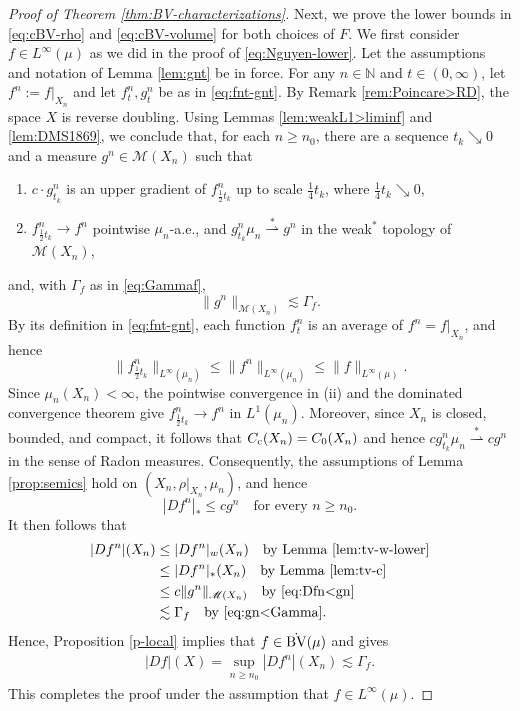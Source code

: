 \documentclass[11pt]{amsart}
\theoremstyle{definition}
\theoremstyle{remark}
\numberwithin{equation}{section}
\newcommand{\Norm}[2]{\|#1\|_{#2}}
\begin{document}
\begin{proof}[Proof of Theorem \ref{thm:BV-characterizations}]
Next, we prove the lower bounds in \eqref{eq:cBV-rho} and
\eqref{eq:cBV-volume} for both choices of $F$.
We first consider $f\in L^\infty(\mu)$ as we did in the proof of \eqref{eq:Nguyen-lower}.
Let the assumptions and notation of Lemma \ref{lem:gnt} be in force.
For any $n\in\mathbb{N}$ and $t\in(0,\infty)$, let $f^n:=f|_{X_n}$ and let $f^n_t,
g^n_t$ be as in \eqref{eq:fnt-gnt}.
By Remark \ref{rem:Poincare>RD}, the space $X$ is reverse doubling. Using Lemmas
\ref{lem:weakL1>liminf} and \ref{lem:DMS1869}, we conclude that,
for each $n\geq n_0$, there are a sequence $t_k\searrow 0$ and a
measure $g^n\in\mathscr M (X_n)$ such that
\begin{enumerate}[\rm(i)]
  \item $c\cdot g_{t_k}^n$ is an upper gradient of $f^n_{\frac12 t_k}$ up to scale $\frac14
  t_k$, where $\frac14 t_k\searrow 0$,
  \item $f^n_{\frac12 t_k}\to f^n$ pointwise $\mu_n$-a.e., and
  $g^n_{t_k}\mu_n\overset{*}{\rightharpoonup} g^n$ in the weak$^*$ topology of
  $\mathscr{M}(X_n)$,
\end{enumerate}
and, with $\Gamma_f$ as in \eqref{eq:Gammaf},
\begin{equation}\label{eq:gn<Gamma}
    \Norm{g^n}{\mathscr M(X_n)}
    \lesssim\Gamma_f.
\end{equation}
By its definition in \eqref{eq:fnt-gnt}, each function $f^n_t$ is an average of
$f^n=f|_{X_n}$,
and hence
$$
\Norm{f^n_{\frac12t_k}}{L^\infty(\mu_n)}\leq  \|f^n\|_{L^\infty(\mu_n)}\leq
\|f\|_{L^\infty(\mu)}.
$$
Since $\mu_n(X_n)<\infty$, the pointwise convergence in (ii) and the dominated convergence
theorem
give
$f^n_{\frac12t_k}\longrightarrow f^n$
in $L^1(\mu_n).$
Moreover, since $X_n$ is closed, bounded, and compact, it follows that
$C_{\rm c}(X_n) = C_0(X_n)$ and hence
$c g^n_{t_k}\mu_n\overset{*}{\rightharpoonup}c g^n$
in the sense of Radon measures.
Consequently, the assumptions of Lemma \ref{prop:semics} hold
on $(X_n,\rho|_{X_n},\mu_n)$, and hence
\begin{equation}\label{eq:Dfn<gn}
  |Df^n|_*\le c g^n\quad\text{for every }n\ge n_0.
\end{equation}
It then follows that
\begin{equation*}
\begin{split}
    |Df^n|(X_n) &\leq |Df^n|_w(X_n)\quad\text{by Lemma \ref{lem:tv-w-lower}} \\
  &\leq |Df^n|_*(X_n)\quad\text{by Lemma \ref{lem:tv-c}} \\
  &\le c\|g^n\|_{\mathscr M(X_n)}\quad\text{by \eqref{eq:Dfn<gn}} \\
  &\lesssim\Gamma_f\quad\text{by \eqref{eq:gn<Gamma}}.
\end{split}
\end{equation*}
Hence, Proposition \ref{p-local} implies that $f\in\dot{\rm BV}(\mu)$
and gives
\begin{align*}
|Df|(X)
=\sup_{n\ge n_0}|Df^n|(X_n)
\lesssim\Gamma_f.
\end{align*}
This completes the proof under the assumption that $f\in L^\infty(\mu)$.



\end{proof}
\end{document}
